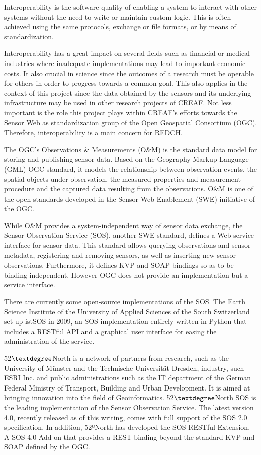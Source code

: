 Interoperability is the software quality of enabling a system to interact with other systems without the need to write or maintain custom logic. This is often achieved using the same protocols, exchange or file formats, or by means of standardization.

Interoperability has a great impact on several fields such as financial or medical industries where inadequate implementations may lead to important economic costs. It also crucial in science since the outcomes of a research must be operable for others in order to progress towards a common goal. This also applies in the context of this project since the data obtained by the sensors and its underlying infrastructure may be used in other research projects of CREAF. Not less important is the role this project plays within CREAF's efforts towards the Sensor Web \cite{SWE} as standardization group of the Open Geospatial Consortium (OGC). Therefore, interoperability is a main concern for REDCH.

The OGC's Observations \& Measurements (O\&M) \cite{OM} is the standard data model for storing and publishing sensor data. Based on the Geography Markup Language (GML) OGC standard, it models the relationship between observation events, the spatial objects under observation, the measured properties and measurement procedure and the captured data resulting from the observations. O\&M is one of the open standards developed in the Sensor Web Enablement (SWE) initiative of the OGC.

While O\&M provides a system-independent way of sensor data exchange, the Sensor Observation Service (SOS), another SWE standard, defines a Web service interface for sensor data. This standard allows querying observations and sensor metadata, registering and removing sensors, as well as inserting new sensor observations. Furthermore, it defines KVP and SOAP bindings so as to be binding-independent. However OGC does not provide an implementation but a service interface.

There are currently some open-source implementations of the SOS. The Earth Science Institute of the University of Applied Sciences of the South Switzerland set up istSOS \cite{istSOS} in 2009, an SOS implementation entirely written in Python that includes a RESTful API and a graphical user interface for easing the administration of the service.

52$\textdegree$North is a network of partners from research, such as the University of Münster and the Technische Universität Dresden, industry, such ESRI Inc. and public administrations such as the IT department of the German Federal Ministry of Transport, Building and Urban Development. It is aimed at bringing innovation into the field of Geoinformatics. 52$\textdegree$North SOS \cite{52north-SOS} is the leading implementation of the Sensor Observation Service. The latest version 4.0, recently released as of this writing, comes with full support of the SOS 2.0 specification. In addition, 52ºNorth has developed the SOS RESTful Extension. A SOS 4.0 Add-on that provides a REST binding beyond the standard KVP and SOAP defined by the OGC.

